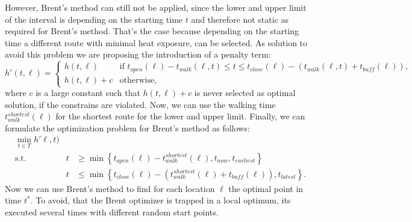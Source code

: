  However, Brent's method can still not be applied, since the lower and upper limit of the interval is depending on the starting time $t$ and therefore not static as required for Brent's method. That's the case because depending on the starting time a different route with minimal heat exposure, can be selected. As solution to avoid this problem we are proposing the introduction of a penalty term:
 \begin{equation}
 \label{eq:optimal-time-penality}
 h'(t,\ell) = \begin{cases}
 h(t,\ell) & \text{if }t_{open}(\ell)-t_{walk}(\ell,t) \leq t \leq  t_{close}(\ell)-(t_{walk}(\ell,t)+t_{buff}(\ell)),\\
 h(t,\ell)  + c & \text{otherwise,}
 \end{cases}
 \end{equation}
 where $c$ is a large constant such that $h(t,\ell) + c$ is never selected as optimal solution, if the constrains are violated. Now, we can use the walking time $t_{walk}^{shortest}(\ell)$  for the shortest route for the lower and upper limit. Finally, we can formulate the optimization problem for Brent's method as follows:
 \begin{subequations}
 	\label{eq:brent-optimization-problem}
 	\begin{alignat}{2}
 	&\min_{t \in T} h'\ell, t) && \\
 	&\text{s.t.} & t & \geq \min\left\lbrace  t_{open}(\ell)-t_{walk}^{shortest}(\ell), t_{now}, t_{earliest} \right\rbrace \\
 	& & t &\leq \min\left\lbrace  t_{close}(\ell)- \left(t_{walk}^{shortest}(\ell) + t_{buff}(\ell)\right), t_{latest} \right\rbrace.
 	\end{alignat}
 \end{subequations}
Now we can use Brent's method to find for each location $\ell$ the optimal point in time $t^*$. To avoid, that the Brent optimizer is trapped in a local optimum, its executed several times with different random start points.
